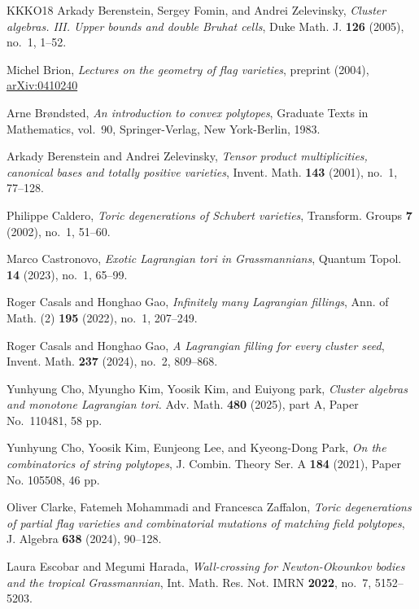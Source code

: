 \documentclass[11pt]{amsart}
\numberwithin{equation}{section}
\theoremstyle{plain}
\theoremstyle{definition}
\numberwithin{equation}{section}
\begin{document}
\begin{thebibliography}{KKKO18}
Arkady Berenstein, Sergey Fomin, and Andrei Zelevinsky, \emph{Cluster algebras.
  {III}. {U}pper bounds and double {B}ruhat cells}, Duke Math. J. \textbf{126}
  (2005), no.~1, 1--52. 

Michel Brion, \emph{Lectures on the geometry of flag varieties}, preprint (2004), \href{https://arxiv.org/abs/math/0410240}{arXiv:0410240}

Arne Br{\o}ndsted, \emph{An introduction to convex polytopes}, Graduate Texts
  in Mathematics, vol.~90, Springer-Verlag, New York-Berlin, 1983. 

Arkady Berenstein and Andrei Zelevinsky, \emph{Tensor product multiplicities, canonical bases and totally
  positive varieties}, Invent. Math. \textbf{143} (2001), no.~1, 77--128.

Philippe Caldero, \emph{Toric degenerations of {S}chubert varieties},
  Transform. Groups \textbf{7} (2002), no.~1, 51--60. 

Marco Castronovo, \emph{Exotic Lagrangian tori in Grassmannians}, Quantum Topol. \textbf{14} (2023), no.~1, 65--99.

Roger Casals and Honghao Gao, \emph{Infinitely many Lagrangian fillings}, Ann. of Math. (2) \textbf{195} (2022), no.~1, 207--249.

Roger Casals and Honghao Gao, \emph{A Lagrangian filling for every cluster seed}, Invent. Math. {\bf 237} (2024), no.~2, 809--868.
  
Yunhyung Cho, Myungho Kim, Yoosik Kim, and Euiyong park, \emph{Cluster algebras and monotone Lagrangian tori.} Adv. Math. \textbf{480} (2025), part A, Paper No.~110481, 58 pp.

Yunhyung Cho, Yoosik Kim, Eunjeong Lee, and Kyeong-Dong Park, \emph{On the combinatorics of string polytopes}, J. Combin. Theory Ser. A {\bf 184} (2021), Paper No. 105508, 46 pp.

  Oliver Clarke, Fatemeh Mohammadi and Francesca Zaffalon, \emph{Toric degenerations of partial flag varieties and combinatorial mutations of matching field polytopes}, J. Algebra {\bf 638} (2024), 90--128.

Laura Escobar and Megumi Harada, \emph{Wall-crossing for Newton-Okounkov bodies and the tropical Grassmannian}, Int. Math. Res. Not. IMRN {\bf 2022}, no.~7, 5152--5203.


\end{thebibliography}
\end{document}
